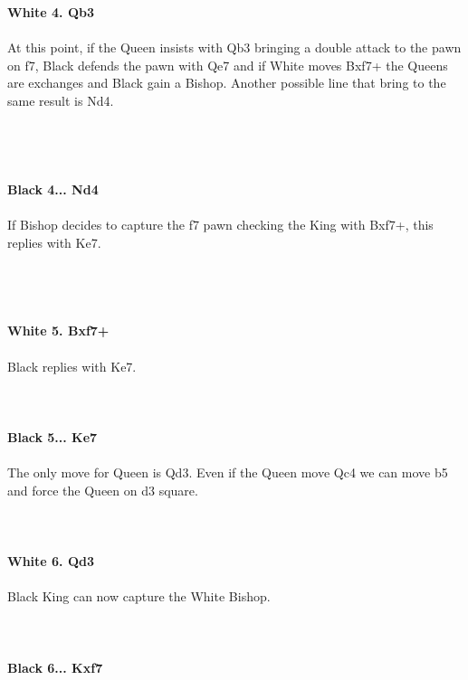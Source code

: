 \documentclass{article}
\begin{document}
\\

\\
\\
\textbf{White 4. Qb3}\\
\\
At this point, if the Queen insists with Qb3 bringing a double attack to the pawn on f7, Black defends the pawn with Qe7 and if White moves Bxf7+ the Queens are exchanges and Black gain a Bishop. Another possible line that bring to the same result is Nd4.\\\\
\\

\\
\\
\textbf{Black 4... Nd4}\\
\\
If Bishop decides to capture the f7 pawn checking the King with Bxf7+, this replies with Ke7.\\\\
\\

\\
\\
\textbf{White 5. Bxf7+}\\
\\
Black replies with Ke7.\\
\\

\\
\\
\textbf{Black 5... Ke7}\\
\\
The only move for Queen is Qd3. Even if the Queen move Qc4 we can move b5 and force the Queen on d3 square.\\
\\

\\
\\
\textbf{White 6. Qd3}\\
\\
Black King can now capture the White Bishop.\\
\\

\\
\\
\textbf{Black 6... Kxf7}\\
\end{document}
